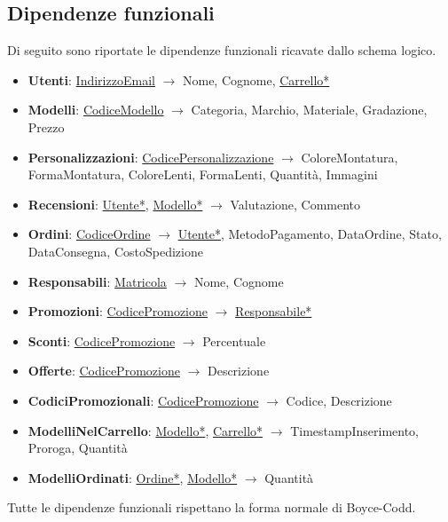 \subsection{Dipendenze funzionali}
Di seguito sono riportate le dipendenze funzionali ricavate dallo schema logico.
\begin{itemize}
	\item \textbf{Utenti}: \underline{IndirizzoEmail} $\rightarrow$ Nome, Cognome,
	      \underline{Carrello*}
	\item \textbf{Modelli}: \underline{CodiceModello} $\rightarrow$ Categoria, Marchio, Materiale,
	      Gradazione, Prezzo
	\item \textbf{Personalizzazioni}: \underline{CodicePersonalizzazione} $\rightarrow$
	      ColoreMontatura, FormaMontatura, ColoreLenti, FormaLenti, Quantità, Immagini
	\item \textbf{Recensioni}: \underline{Utente*}, \underline{Modello*} $\rightarrow$ Valutazione,
	      Commento
	\item \textbf{Ordini}: \underline{CodiceOrdine} $\rightarrow$ \underline{Utente*},
	      MetodoPagamento, DataOrdine, Stato, DataConsegna, CostoSpedizione
	\item \textbf{Responsabili}: \underline{Matricola} $\rightarrow$ Nome, Cognome
	\item \textbf{Promozioni}: \underline{CodicePromozione} $\rightarrow$ \underline{Responsabile*}
	\item \textbf{Sconti}: \underline{CodicePromozione} $\rightarrow$ Percentuale
	\item \textbf{Offerte}: \underline{CodicePromozione} $\rightarrow$ Descrizione
	\item \textbf{CodiciPromozionali}: \underline{CodicePromozione} $\rightarrow$ Codice,
	      Descrizione
	\item \textbf{ModelliNelCarrello}: \underline{Modello*}, \underline{Carrello*} $\rightarrow$
	      TimestampInserimento, Proroga, Quantità
	\item \textbf{ModelliOrdinati}: \underline{Ordine*}, \underline{Modello*} $\rightarrow$ Quantità
\end{itemize}
Tutte le dipendenze funzionali rispettano la forma normale di Boyce-Codd.
